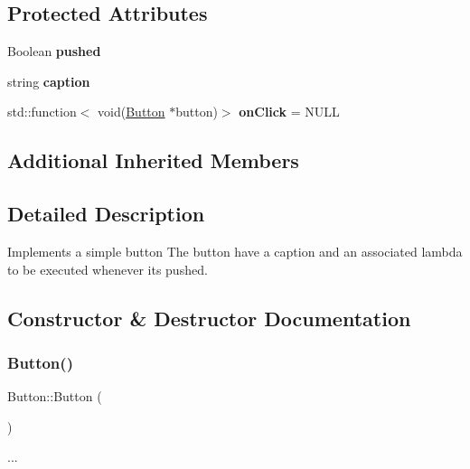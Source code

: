 \subsection*{Protected Attributes}
\begin{DoxyCompactItemize}
\item 
\mbox{\label{class_button_af6ed106421f242c44f954440e419cf18}} 
Boolean {\bfseries pushed}
\item 
\mbox{\label{class_button_a265d7cb5d80829f7195344f773069c0b}} 
string {\bfseries caption}
\item 
\mbox{\label{class_button_a37251a2866eec58f8a56772a327bd984}} 
std\+::function$<$ void(\hyperlink{class_button}{Button} $\ast$button)$>$ {\bfseries on\+Click} = N\+U\+LL
\end{DoxyCompactItemize}
\subsection*{Additional Inherited Members}


\subsection{Detailed Description}
Implements a simple button  The button have a caption and an associated lambda to be executed whenever it\textquotesingle{}s pushed. 

\subsection{Constructor \& Destructor Documentation}
\mbox{\label{class_button_a3b36df1ae23c58aedb9e15a713159459}} 
\subsubsection{\texorpdfstring{Button()}{Button()}}
{\footnotesize\ttfamily Button\+::\+Button (\begin{DoxyParamCaption}{ }\end{DoxyParamCaption})}

... \mbox{\label{class_button_a2a001eb9c3cc8ae54768a850dd345002}} 
